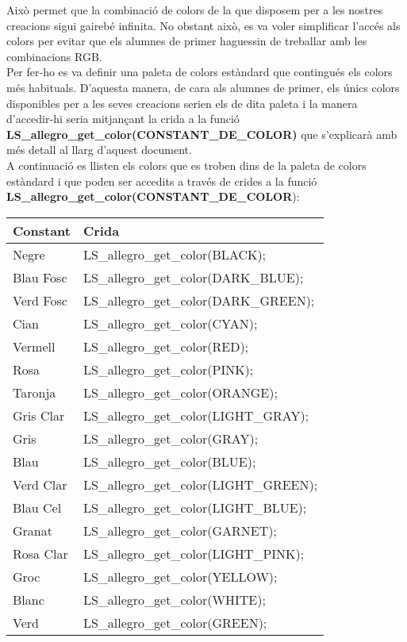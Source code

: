 \documentclass[11pt]{article}
\begin{document}
\noindent Això permet que la combinació de colors de la que disposem per a les nostres creacions sigui gairebé infinita. No obstant això, es va voler simplificar l'accés als colors per evitar que els alumnes de primer haguessin de treballar amb les combinacions RGB.\\

\noindent Per fer-ho es va definir una paleta de colors estàndard que contingués els colors més habituals. D'aquesta manera, de cara als alumnes de primer, els únics colors disponibles per a les seves creacions serien els de dita paleta i la manera d'accedir-hi seria mitjançant la crida a la funció \textbf{LS\_allegro\_get\_color(CONSTANT\_DE\_COLOR)} que s'explicarà amb més detall al llarg d'aquest document.\\

\noindent A continuació es llisten els colors que es troben dins de la paleta de colors estàndard i que poden ser accedits a través de crides a la funció \textbf{LS\_allegro\_get\_color(CONSTANT\_DE\_COLOR}):
\begin{center}
	\begin{tabular}{| l | l |}
		\hline
		Constant & Crida\\
		\hline                      
  		Negre & LS\_allegro\_get\_color(BLACK); \\
  		\hline
  		Blau Fosc & LS\_allegro\_get\_color(DARK\_BLUE); \\
  		\hline
  		Verd Fosc & LS\_allegro\_get\_color(DARK\_GREEN); \\
  		\hline
  		Cian & LS\_allegro\_get\_color(CYAN); \\
  		\hline
  		Vermell & LS\_allegro\_get\_color(RED); \\
  		\hline
  		Rosa & LS\_allegro\_get\_color(PINK); \\
  		\hline
  		Taronja & LS\_allegro\_get\_color(ORANGE); \\
  		\hline
  		Gris Clar & LS\_allegro\_get\_color(LIGHT\_GRAY); \\
  		\hline
  		Gris & LS\_allegro\_get\_color(GRAY); \\
  		\hline
  		Blau & LS\_allegro\_get\_color(BLUE); \\
  		\hline
  		Verd Clar & LS\_allegro\_get\_color(LIGHT\_GREEN); \\
  		\hline
  		Blau Cel & LS\_allegro\_get\_color(LIGHT\_BLUE); \\
  		\hline
  		Granat & LS\_allegro\_get\_color(GARNET); \\
  		\hline
  		Rosa Clar & LS\_allegro\_get\_color(LIGHT\_PINK); \\
  		\hline
  		Groc & LS\_allegro\_get\_color(YELLOW); \\
  		\hline
  		Blanc & LS\_allegro\_get\_color(WHITE); \\
  		\hline
  		Verd & LS\_allegro\_get\_color(GREEN); \\
  		\hline  
	\end{tabular}
\end{center}
\end{document}

